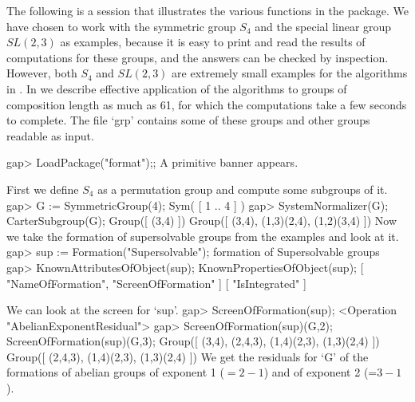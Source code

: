 



The following is a {\GAP} session that illustrates the various functions
in the package.  We have chosen to work with the symmetric group $S_4$
and the special linear group $SL(2,3)$ as examples, because it is easy
to print and read the results of computations for these groups, and the
answers can be checked by inspection. However, both
$S_4$ and $SL(2,3)$ are extremely small examples for the algorithms in
\FORMAT. In
\cite{EW} we describe effective application of the algorithms  to groups
of  composition length as much as 61, for which the computations take
a few seconds to complete. The file `grp' contains some of these groups and other groups readable as {\GAP} input.

\beginexample
gap> LoadPackage("format");;
\endexample
A primitive banner appears.

First we define $S_4$ as a permutation group and compute some 
subgroups of it.
\beginexample
gap> G := SymmetricGroup(4);
Sym( [ 1 .. 4 ] )
gap> SystemNormalizer(G);  CarterSubgroup(G);
Group([ (3,4) ])
Group([ (3,4), (1,3)(2,4), (1,2)(3,4) ])
\endexample
Now we take the formation of supersolvable groups from the examples
and look at it.
\beginexample
gap> sup := Formation("Supersolvable");
formation of Supersolvable groups 
gap> KnownAttributesOfObject(sup); KnownPropertiesOfObject(sup);
[ "NameOfFormation", "ScreenOfFormation" ]
[ "IsIntegrated" ]
\endexample 

We can look at the screen for `sup'.
\beginexample
gap> ScreenOfFormation(sup);
<Operation "AbelianExponentResidual">
gap> ScreenOfFormation(sup)(G,2); ScreenOfFormation(sup)(G,3);
Group([ (3,4), (2,4,3), (1,4)(2,3), (1,3)(2,4) ])
Group([ (2,4,3), (1,4)(2,3), (1,3)(2,4) ])
\endexample
We get the residuals for `G' of the formations of abelian groups of exponent 1 ($= 2-1$) and of exponent 2 (=$3-1$).

